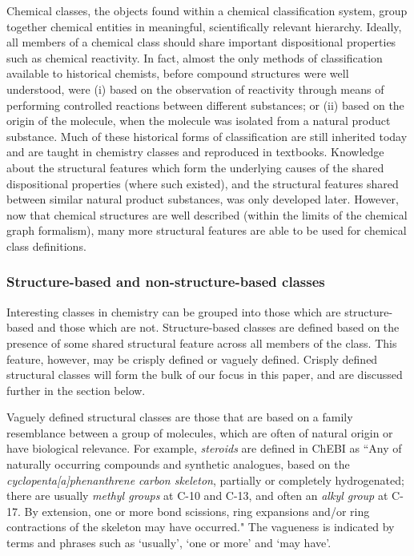 \documentclass[10pt]{bmc_article}
\newenvironment{bmcformat}{\baselineskip20pt\sloppy\setboolean{publ}{false}}{\baselineskip20pt\sloppy}
\begin{document}
\begin{bmcformat}
Chemical classes, the objects found within a chemical classification system, group together chemical entities in meaningful, scientifically relevant hierarchy. Ideally, all members of a chemical class should share important dispositional properties such as chemical reactivity. In fact, almost the only methods of classification available to historical chemists, before compound structures were well understood, were (i) based on the observation of reactivity through means of performing controlled reactions between different substances; or (ii) based on the origin of the molecule, when the molecule was isolated from a natural product substance. Much of these historical forms of classification are still inherited today and are taught in chemistry classes and reproduced in textbooks. Knowledge about the structural features which form the underlying causes of the shared dispositional properties (where such existed), and the structural features shared between similar natural product substances, was only developed later. However, now that chemical structures are well described (within the limits of the chemical graph formalism), many more structural features are able to be used for chemical class definitions. 

\subsubsection*{Structure-based and non-structure-based classes}
Interesting classes in chemistry can be grouped into those which are structure-based and those which are not. Structure-based classes are defined based on the presence of some shared structural feature across all members of the class.  This feature, however, may be crisply defined or vaguely defined.  Crisply defined structural classes will form the bulk of our focus in this paper, and are discussed further in the section \textit{} below.   

Vaguely defined structural classes are those that are based on a family resemblance between a group of molecules, which are often of natural origin or have biological relevance.  For example, \textit{steroids} are defined in ChEBI as ``Any of naturally occurring compounds and synthetic analogues, based on the \textit{cyclopenta[a]phenanthrene carbon skeleton}, partially or completely hydrogenated; there are usually \textit{methyl groups} at C-10 and C-13, and often an \textit{alkyl group} at C-17. By extension, one or more bond scissions, ring expansions and/or ring contractions of the skeleton may have occurred."  The vagueness is indicated by terms and phrases such as `usually', `one or more' and `may have'.


\end{bmcformat}
\end{document}
